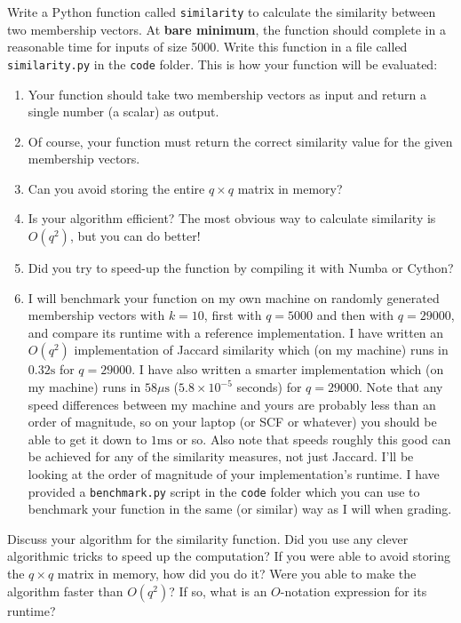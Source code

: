 \documentclass[letterpaper,12pt]{article}
\begin{document}
Write a Python function called \texttt{similarity} to calculate the similarity between two membership vectors. At \textbf{bare minimum}, the function should complete in a reasonable time for inputs of size 5000. Write this function in a file called \texttt{similarity.py} in the \texttt{code} folder. This is how your function will be evaluated:
\begin{enumerate}
    \item Your function should take two membership vectors as input and return a single number (a scalar) as output.
    \item Of course, your function must return the correct similarity value for the given membership vectors.
    \item Can you avoid storing the entire $q\times q$ matrix in memory?
    \item Is your algorithm efficient? The most obvious way to calculate similarity is $O(q^2)$, but you can do better!
    \item Did you try to speed-up the function by compiling it with Numba or Cython?
    \item I will benchmark your function on my own machine on randomly generated membership vectors with $k=10$, first with $q=5000$ and then with $q=29000$, and compare its runtime with a reference implementation. I have written an $O(q^2)$ implementation of Jaccard similarity which (on my machine) runs in $0.32\mathrm{s}$ for $q=29000$. I have also written a smarter implementation which (on my machine) runs in $58\mu \mathrm{s}$ ($5.8\times 10^{-5}$ seconds) for $q=29000$. Note that any speed differences between my machine and yours are probably less than an order of magnitude, so on your laptop (or SCF or whatever) you should be able to get it down to $1\textrm{ms}$ or so. Also note that speeds roughly this good can be achieved for any of the similarity measures, not just Jaccard. I'll be looking at the order of magnitude of your implementation's runtime. I have provided a \texttt{benchmark.py} script in the \texttt{code} folder which you can use to benchmark your function in the same (or similar) way as I will when grading.
\end{enumerate}
Discuss your algorithm for the similarity function. Did you use any clever algorithmic tricks to speed up the computation? If you were able to avoid storing the $q\times q$ matrix in memory, how did you do it? Were you able to make the algorithm faster than $O(q^2)$? If so, what is an $O$-notation expression for its runtime?
\end{document}
